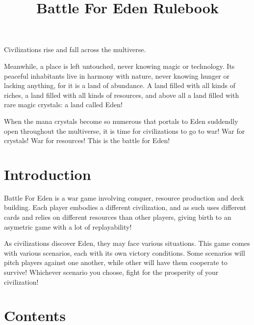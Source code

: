 \documentclass[a4paper]{article}
\begin{document}
\title{Battle For Eden Rulebook}
\maketitle


    Civilizations rise and fall across the multiverse.

    Meanwhile, a place is left untouched, never knowing magic or technology.
    Its peaceful inhabitants live in harmony with nature, never knowing hunger or lacking anything, for it is a land of abundance.
    A land filled with all kinds of riches, a land filled with all kinds of resources,
    and above all a land filled with rare magic crystals: a land called Eden!

    When the mana crystals become so numerous that portals to Eden suddendly open throughout the multiverse,
    it is time for civilizations to go to war! War for crystals! War for resources!
    This is the battle for Eden!



\section{Introduction}

    Battle For Eden is a war game involving conquer, resource production and deck building.
    Each player embodies a different civilization, and as such uses different cards and relies on
    different resources than other players, giving birth to an asymetric game with a lot of replayability!

    As civilizations discover Eden, they may face various situations.
    This game comes with various scenarios, each with its own victory conditions.
    Some scenarios will pitch players against one another, while other will have them cooperate to survive!
    Whichever scenario you choose, fight for the prosperity of your civilization!



\section{Contents}
\end{document}
